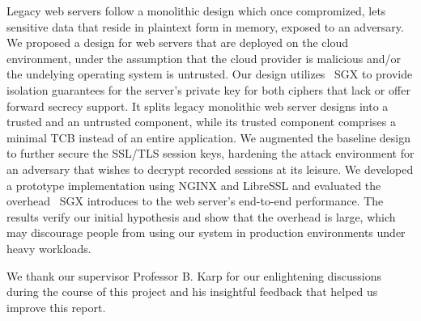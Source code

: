 \documentclass[../main.tex]{subfiles}
\begin{document}
Legacy web servers follow a monolithic design which once compromized, lets
sensitive data that reside in plaintext form in memory, exposed to an
adversary.  We proposed a design for web servers that are deployed on the cloud
environment, under the assumption that the cloud provider is malicious and/or
the undelying operating system is untrusted. Our design utilizes \Intel~SGX to
provide isolation guarantees for the server's private key for both ciphers that
lack or offer forward secrecy support. It splits legacy monolithic web server
designs into a trusted and an untrusted component, while its trusted component
comprises a minimal TCB instead of an entire application. We augmented the
baseline design to further secure the SSL/TLS session keys, hardening the
attack environment for an adversary that wishes to decrypt recorded sessions at
its leisure. We developed a prototype implementation using NGINX and LibreSSL
and evaluated the overhead \Intel~SGX introduces to the web server's end-to-end
performance. The results verify our initial hypothesis and show that the
overhead is large, which may discourage people from using our system in
production environments under heavy workloads.

We thank our supervisor Professor B. Karp for our enlightening discussions
during the course of this project and his insightful feedback that helped us
improve this report.
\end{document}
